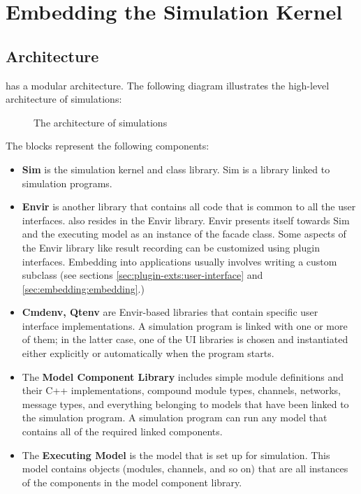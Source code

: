 \chapter{Embedding the Simulation Kernel}
\label{cha:embedding}

\section{Architecture}
\label{sec:embedding:architecture}

{\opp} has a modular architecture. The following diagram illustrates the
high-level architecture of {\opp} simulations:

\begin{figure}[htbp]
  \begin{center}
    
    \caption{The architecture of {\opp} simulations}
  \end{center}
\end{figure}

The blocks represent the following components:

\begin{itemize}
  \item \textbf{Sim} is the simulation kernel and class
    library. Sim is a library linked to
    simulation programs.
  \item \textbf{Envir} is another library that contains all code
    that is common to all the user interfaces.  also resides
    in the Envir library. Envir presents itself towards Sim and the executing model
    as an instance of the  facade class. Some aspects of the
    Envir library like result recording can be customized
    using plugin interfaces. Embedding {\opp} into applications
    usually involves writing a custom  subclass (see sections
    \ref{sec:plugin-exts:user-interface} and \ref{sec:embedding:embedding}.)
  \item \textbf{Cmdenv, Qtenv} are Envir-based libraries that contain
    specific user interface implementations. A simulation program
    is linked with one or more of them; in the latter case, one of the UI libraries
    is chosen and instantiated either explicitly or automatically when the program starts.
  \item The \textbf{Model Component Library} includes simple module definitions and
    their C++ implementations, compound module types, channels, networks,
    message types, and everything belonging to models that
    have been linked to the simulation program. A simulation program can
    run any model that contains all of the required linked components.
  \item The \textbf{Executing Model} is the model that is set up
    for simulation. This model contains objects (modules, channels, and so on) that
    are all instances of the components in the model component library.
\end{itemize}

